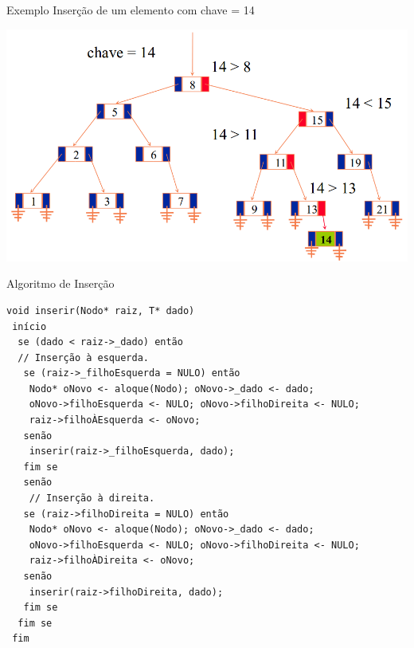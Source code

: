 \documentclass[12pt,table,xcolor={dvipsnames}]{beamer}
\begin{document}
\begin{frame}[fragile]{Exemplo}
Inserção de um elemento com chave = 14
\begin{center}
\includegraphics[scale=.3]{arv7.png} 
\end{center}
\end{frame}

\begin{frame}[fragile]{Algoritmo de Inserção}
          \begin{lstlisting}
void inserir(Nodo* raiz, T* dado)
 início
  se (dado < raiz->_dado) então
  // Inserção à esquerda.
   se (raiz->_filhoEsquerda = NULO) então
    Nodo* oNovo <- aloque(Nodo); oNovo->_dado <- dado;
    oNovo->filhoEsquerda <- NULO; oNovo->filhoDireita <- NULO;
    raiz->filhoÀEsquerda <- oNovo;
   senão
    inserir(raiz->_filhoEsquerda, dado);
   fim se
   senão
    // Inserção à direita.
   se (raiz->filhoDireita = NULO) então
    Nodo* oNovo <- aloque(Nodo); oNovo->_dado <- dado;
    oNovo->filhoEsquerda <- NULO; oNovo->filhoDireita <- NULO;
    raiz->filhoÀDireita <- oNovo;
   senão
    inserir(raiz->filhoDireita, dado);
   fim se
  fim se  
 fim
 \end{lstlisting}
\end{frame} 
\end{document}
